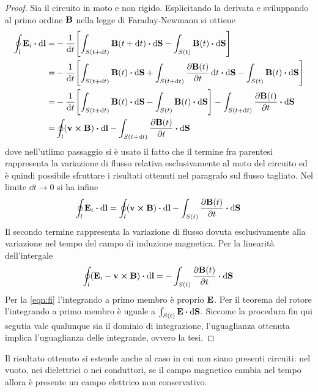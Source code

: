 \begin{proof}
    Sia il circuito in moto e non rigido. Esplicitando la derivata e sviluppando al primo ordine $\vb{B}$ nella legge di Faraday-Newmann 
    si ottiene
    \[
        \begin{split}
            \oint_l \vb{E}_i\vdot\dd{\vb{l}}
            =&-\rec{\dd{t}}\Biggl[\int_{S(t+\dd{t})}\vb{B}(t+\dd{t})\vdot\dd{\vb{S}}-\int_{S(t)}\vb{B}(t)\vdot\dd{\vb{S}} \Biggr] \\
            =&-\rec{\dd{t}}\Biggl[\int_{S(t+\dd{t})}\vb{B}(t)\vdot\dd{\vb{S}}
            +\int_{S(t+\dd{t})}\pdv{\vb{B}(t)}{t}\dd{t}\vdot\dd{\vb{S}} -\int_{S(t)}\vb{B}(t)\vdot\dd{\vb{S}} \Biggr] \\
            =&-\rec{\dd{t}}\Biggl[\int_{S(t+\dd{t})}\vb{B}(t)\vdot\dd{\vb{S}}
            -\int_{S(t)}\vb{B}(t)\vdot\dd{\vb{S}} \Biggr] - \int_{S(t+\dd{t})}\pdv{\vb{B}(t)}{t}\vdot\dd{\vb{S}}\\
            =&\oint_l(\vb{v}\cp\vb{B})\vdot\dd{\vb{l}} - \int_{S(t+\dd{t})}\pdv{\vb{B}(t)}{t}\vdot\dd{\vb{S}}\\
        \end{split}
    \]
    dove nell'utlimo passaggio si è usato il fatto che il termine fra parentesi rappresenta la variazione di flusso
    relativa esclusivamente al moto del circuito ed è quindi possibile sfruttare i risultati ottenuti
    nel paragrafo sul flusso tagliato. Nel limite $\dd{t}\to 0$ si ha infine
    \[
        \oint_l \vb{E}_i\vdot\dd{\vb{l}}=\oint_l(\vb{v}\cp\vb{B})\vdot\dd{\vb{l}} - \int_{S(t)}\pdv{\vb{B}(t)}{t}\vdot\dd{\vb{S}}\\
    \]
    Il secondo termine rappresenta la variazione di flusso dovuta esclusivamente alla variazione
    nel tempo del campo di induzione magnetica. Per la linearità dell'intergale
    \[
        \oint_l (\vb{E}_i-\vb{v}\cp\vb{B})\vdot\dd{\vb{l}}= - \int_{S(t)}\pdv{\vb{B}(t)}{t}\vdot\dd{\vb{S}}\\
    \]
    Per la \eqref{eqn:fi} l'integrando a primo membro è proprio $\vb{E}$. 
    Per il teorema del rotore l'integrando a primo membro è uguale a $\int_{S(t)}\vb{E}\vdot\dd{\vb{S}}$.
    Siccome la procedura fin qui segutia vale qualunque sia il dominio di integrazione, l'uguaglianza ottenuta implica
    l'uguaglianza delle integrande, ovvero la tesi.
\end{proof}
Il risultato ottenuto si estende anche al caso in cui non siano presenti circuiti: nel vuoto, nei dielettrici o nei
conduttori, se il campo magnetico cambia nel tempo allora è presente un campo elettrico non conservativo.
